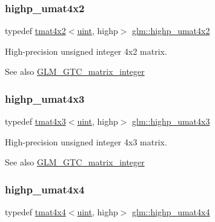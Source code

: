 \subsubsection{\texorpdfstring{highp\+\_\+umat4x2}{highp\_umat4x2}}
{\footnotesize\ttfamily typedef \hyperlink{structglm_1_1tmat4x2}{tmat4x2}$<$\hyperlink{group__core__precision_ga4fd29415871152bfb5abd588334147c8}{uint}, highp$>$ \hyperlink{group__gtc__matrix__integer_ga4015bf99a981bf271fd516f9b2cb6724}{glm\+::highp\+\_\+umat4x2}}

High-\/precision unsigned integer 4x2 matrix. \begin{DoxySeeAlso}{See also}
\hyperlink{group__gtc__matrix__integer}{G\+L\+M\+\_\+\+G\+T\+C\+\_\+matrix\+\_\+integer} 
\end{DoxySeeAlso}
\mbox{\label{group__gtc__matrix__integer_gaa394320db559302e18c8b64013b8d7fb}} 
\subsubsection{\texorpdfstring{highp\+\_\+umat4x3}{highp\_umat4x3}}
{\footnotesize\ttfamily typedef \hyperlink{structglm_1_1tmat4x3}{tmat4x3}$<$\hyperlink{group__core__precision_ga4fd29415871152bfb5abd588334147c8}{uint}, highp$>$ \hyperlink{group__gtc__matrix__integer_gaa394320db559302e18c8b64013b8d7fb}{glm\+::highp\+\_\+umat4x3}}

High-\/precision unsigned integer 4x3 matrix. \begin{DoxySeeAlso}{See also}
\hyperlink{group__gtc__matrix__integer}{G\+L\+M\+\_\+\+G\+T\+C\+\_\+matrix\+\_\+integer} 
\end{DoxySeeAlso}
\mbox{\label{group__gtc__matrix__integer_gaf5365128f6fd506442843fb5a441f385}} 
\subsubsection{\texorpdfstring{highp\+\_\+umat4x4}{highp\_umat4x4}}
{\footnotesize\ttfamily typedef \hyperlink{structglm_1_1tmat4x4}{tmat4x4}$<$\hyperlink{group__core__precision_ga4fd29415871152bfb5abd588334147c8}{uint}, highp$>$ \hyperlink{group__gtc__matrix__integer_gaf5365128f6fd506442843fb5a441f385}{glm\+::highp\+\_\+umat4x4}}

